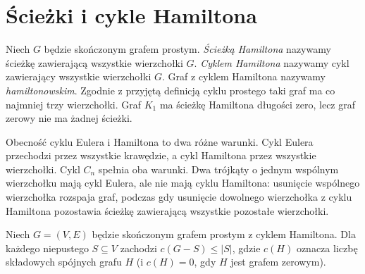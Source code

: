 \section{Ścieżki i cykle Hamiltona}
\label{sec:tg-hamilton}

\begin{definicja}[Hamiltonowskość]
Niech $G$ będzie skończonym grafem prostym.
\emph{Ścieżką Hamiltona} nazywamy ścieżkę zawierającą
wszystkie wierzchołki $G$. \emph{Cyklem Hamiltona}
nazywamy cykl zawierający wszystkie wierzchołki $G$.
Graf z cyklem Hamiltona nazywamy \emph{hamiltonowskim}.
Zgodnie z przyjętą definicją cyklu prostego taki graf
ma co najmniej trzy wierzchołki. Graf $K_1$ ma ścieżkę
Hamiltona długości zero, lecz graf zerowy nie ma
żadnej ścieżki.
\end{definicja}

Obecność cyklu Eulera i Hamiltona to dwa różne warunki.
Cykl Eulera przechodzi przez wszystkie krawędzie,
a cykl Hamiltona przez wszystkie wierzchołki.
Cykl $C_n$ spełnia oba warunki. Dwa trójkąty o jednym
wspólnym wierzchołku mają cykl Eulera, ale nie mają
cyklu Hamiltona: usunięcie wspólnego wierzchołka
rozspaja graf, podczas gdy usunięcie dowolnego
wierzchołka z cyklu Hamiltona pozostawia ścieżkę
zawierającą wszystkie pozostałe wierzchołki.

\begin{center}
\end{center}

\begin{stwierdzenie}
\label{prop:tg-hamilton-components}
Niech $G=(V,E)$ będzie skończonym grafem prostym
z cyklem Hamiltona. Dla każdego niepustego
$S\subseteq V$ zachodzi $c(G-S)\le |S|$, gdzie
$c(H)$ oznacza liczbę składowych spójnych grafu $H$
(i $c(H)=0$, gdy $H$ jest grafem zerowym).
\end{stwierdzenie}

